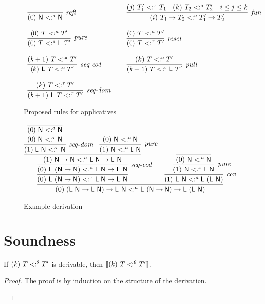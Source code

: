 \documentclass[acmsmall,screen,review]{acmart}
\begin{document}
\begin{figure}
  \[
  \begin{array}{lll}
    \rlrefl
    &\ &
    \rlfun
    \\ \\
    \rlpure
    &\ &
    \rlreset
    \\ \\
    \rlseqcod
    &\ &
    \rlpull
    \\ \\
    \rlseqdom
    &\ &\ 
  \end{array}
  \]
\caption{Proposed rules for applicatives}
\label{fig:decproc}
\end{figure}


\begin{figure}
  \[
    \infer{\subt{0}{(\tl\ \tn \to \tl\ \tn)\to \tl\ \tn}{a}{\tl\ (\tn\to\tn) \to \tl\ (\tl\ \tn)}}
           {\infer{\subt{0}{\tl\ (\tn\to\tn)}{\tau}{\tl\ \tn\to\tl\ \tn}}
             {\infer[\textit{seq-cod}]{\subt{0}{\tl\ (\tn\to\tn)}{a}{\tl\ \tn\to\tl\ \tn}}
               {\infer{\subt{1}{\tn\to\tn}{a}{\tl\ \tn\to\tl\ \tn}}
                 {\infer[\textit{seq-dom}]{\subt{1}{\tl\ \tn}{\tau}{\tn}}
                        {\infer{\subt{0}{\tn}{\tau}{\tn}}{\infer{\subt{0}{\tn}{a}{\tn}}{\ }}}
                        &\infer[\textit{pure}]{\subt{1}{\tn}{a}{\tl\ \tn}}
                               {\infer{\subt{0}{\tn}{a}{\tn}}{\ }}}}
             }
             & \infer[\textit{cov}]{\subt{1}{\tl\ \tn}{a}{\tl\ (\tl\ \tn)}}
                     {\infer[\textit{pure}]{\subt{1}{\tn}{a}{\tl\ \tn}}
                     {\infer{\subt{0}{\tn}{a}{\tn}}{\ }}}}
\]

  \caption{Example derivation}
  \label{fig:ex}
\end{figure}

\section{Soundness}

\begin{theorem}
  If $(k)\ T <:^{\theta} T'$ is derivable, then $\llbracket (k)\ T <:^{\theta} T' \rrbracket$.
\end{theorem}
\begin{proof}
  The proof is by induction on the structure of the derivation.

  \caseb
  \[
  \]

  \end{proof}




\nocite{peytonjones2001}
\end{document}
